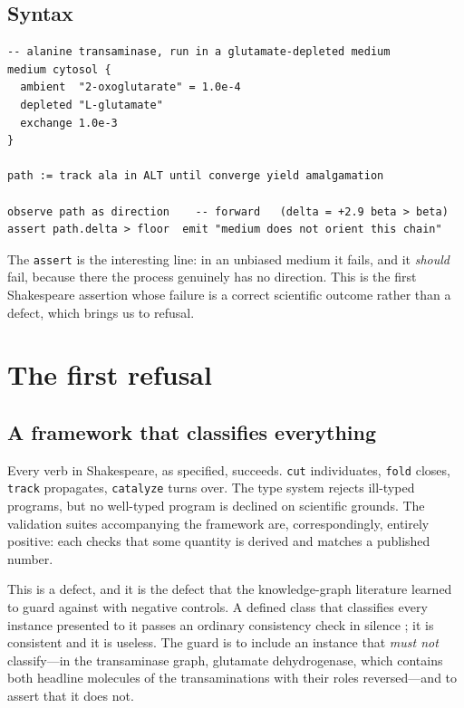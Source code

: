 \documentclass[11pt,twocolumn,a4paper]{article}
\theoremstyle{thmstyle}
\theoremstyle{definition}
\theoremstyle{remark}
\newcommand{\shk}[1]{\texttt{#1}}
\begin{document}
\subsection{Syntax}

\begin{lstlisting}[caption={Direction derived from the declared medium.}]
-- alanine transaminase, run in a glutamate-depleted medium
medium cytosol {
  ambient  "2-oxoglutarate" = 1.0e-4
  depleted "L-glutamate"
  exchange 1.0e-3
}

path := track ala in ALT until converge yield amalgamation

observe path as direction    -- forward   (delta = +2.9 beta > beta)
assert path.delta > floor  emit "medium does not orient this chain"
\end{lstlisting}

The \shk{assert} is the interesting line: in an unbiased medium it fails,
and it \emph{should} fail, because there the process genuinely has no
direction. This is the first Shakespeare assertion whose failure is a
correct scientific outcome rather than a defect, which brings us to
refusal.

\section{The first refusal}
\label{sec:refusal}

\subsection{A framework that classifies everything}

Every verb in Shakespeare, as specified, succeeds. \shk{cut} individuates,
\shk{fold} closes, \shk{track} propagates, \shk{catalyze} turns over. The
type system rejects ill-typed programs, but no well-typed program is
declined on scientific grounds. The validation suites accompanying the
framework are, correspondingly, entirely positive: each checks that some
quantity is derived and matches a published number.

This is a defect, and it is the defect that the knowledge-graph literature
learned to guard against with negative controls. A defined class that
classifies every instance presented to it passes an ordinary consistency
check in silence \citep{glimm2014hermit,baader2003dlhandbook}; it is
consistent and it is useless. The guard is to include an instance that
\emph{must not} classify---in the transaminase graph, glutamate
dehydrogenase, which contains both headline molecules of the
transaminations with their roles reversed---and to assert that it does
not.
\end{document}
